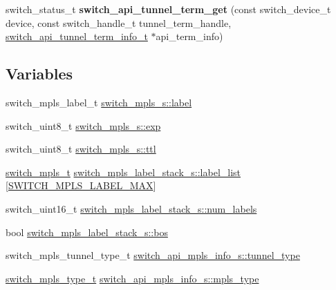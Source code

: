 \begin{DoxyCompactItemize}
\item 
\hypertarget{group__Tunnel_ga1aab5c3202d708d77c68cf6f9ef5003f}{switch\+\_\+status\+\_\+t {\bfseries switch\+\_\+api\+\_\+tunnel\+\_\+term\+\_\+get} (const switch\+\_\+device\+\_\+t device, const switch\+\_\+handle\+\_\+t tunnel\+\_\+term\+\_\+handle, \hyperlink{structswitch__api__tunnel__term__info__s}{switch\+\_\+api\+\_\+tunnel\+\_\+term\+\_\+info\+\_\+t} $\ast$api\+\_\+term\+\_\+info)}\label{group__Tunnel_ga1aab5c3202d708d77c68cf6f9ef5003f}

\end{DoxyCompactItemize}
\subsection*{Variables}
\begin{DoxyCompactItemize}
\item 
switch\+\_\+mpls\+\_\+label\+\_\+t \hyperlink{group__Tunnel_ga2c144b7c6e8e43b29bf0fe4cc2075204}{switch\+\_\+mpls\+\_\+s\+::label}
\item 
switch\+\_\+uint8\+\_\+t \hyperlink{group__Tunnel_gaa051a49261e173522f5912b8ba8d0c73}{switch\+\_\+mpls\+\_\+s\+::exp}
\item 
switch\+\_\+uint8\+\_\+t \hyperlink{group__Tunnel_ga0a0835cb20b911ab796b4050f6c6bb49}{switch\+\_\+mpls\+\_\+s\+::ttl}
\item 
\hyperlink{group__Tunnel_gaa1a400888248e1e756adbd37f010f288}{switch\+\_\+mpls\+\_\+t} \hyperlink{group__Tunnel_gaf21845a304f409165053ed260fc8da3e}{switch\+\_\+mpls\+\_\+label\+\_\+stack\+\_\+s\+::label\+\_\+list} \mbox{[}\hyperlink{group__Tunnel_ga358d11e6167bb874159a7b6ac253221b}{S\+W\+I\+T\+C\+H\+\_\+\+M\+P\+L\+S\+\_\+\+L\+A\+B\+E\+L\+\_\+\+M\+A\+X}\mbox{]}
\item 
switch\+\_\+uint16\+\_\+t \hyperlink{group__Tunnel_ga601501fd20b6f5d298fb0f06ce0897d5}{switch\+\_\+mpls\+\_\+label\+\_\+stack\+\_\+s\+::num\+\_\+labels}
\item 
bool \hyperlink{group__Tunnel_gaefae3f185e3c94cb263058c963043565}{switch\+\_\+mpls\+\_\+label\+\_\+stack\+\_\+s\+::bos}
\item 
switch\+\_\+mpls\+\_\+tunnel\+\_\+type\+\_\+t \hyperlink{group__Tunnel_ga2f8e73c9ca6cc1282e923f8e3ca982e5}{switch\+\_\+api\+\_\+mpls\+\_\+info\+\_\+s\+::tunnel\+\_\+type}
\item 
\hyperlink{group__Tunnel_ga9757d049be2922674f9c5350384ff3ae}{switch\+\_\+mpls\+\_\+type\+\_\+t} \hyperlink{group__Tunnel_gaaba85ce3e34b028c217449796c83d6f0}{switch\+\_\+api\+\_\+mpls\+\_\+info\+\_\+s\+::mpls\+\_\+type}

\end{DoxyCompactItemize}
